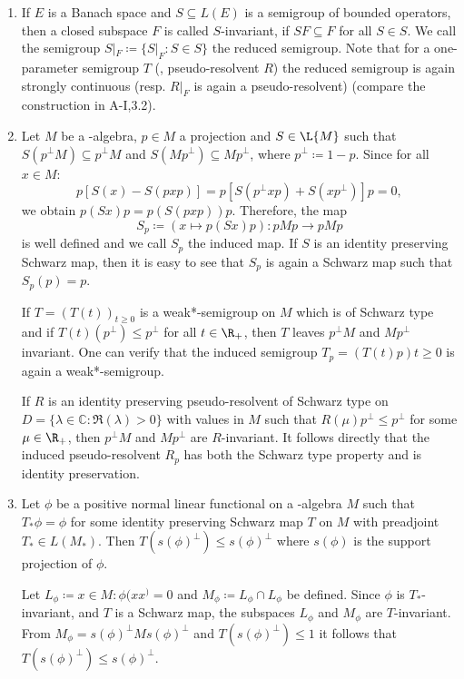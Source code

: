 \begin{enumerate}[1., wide]
\item
If $ E $ is a Banach space and $ S \subseteq L(E) $ is a semigroup of bounded operators, then a closed subspace $ F $ is called $ S $-invariant, if $ SF \subseteq F $ for all $ S \in S $.
We call the semigroup $ S|_{F} \coloneqq \{S|_{F} \colon S \in S \} $ the reduced semigroup.
Note that for a one-parameter semigroup $ T $ (\resp, pseudo-resolvent $ R $) the reduced semigroup is again strongly continuous (resp. $ R|_{F} $ is again a pseudo-resolvent) (compare the construction in A-I,3.2).

\item
Let $ M $ be a \WA-algebra, $ p \in M $ a projection and $ S \in \L{M} $ such that $ S(p^{\perp}M) \subseteq p^{\perp}M $ and $ S(Mp^{\perp}) \subseteq Mp^{\perp} $, where $ p^{\perp} \coloneqq 1-p $.
Since for all $ x \in M $:
\[
p[S(x) - S(pxp)] = p[S(p^{\perp}xp) + S(xp^{\perp})]p = 0,
\]
we obtain $ p(Sx)p = p(S(pxp))p $.
Therefore, the map
\[
S_{p} \coloneqq (x \mapsto p(Sx)p) \colon pMp \to pMp
\]
is well defined and we call $ S_{p} $ the induced map.
If $ S $ is an identity preserving Schwarz map, then it is easy to see that $ S_{p} $ is again a Schwarz map such that $ S_{p}(p) = p $.

If $ T = (T(t))_{t\geq0} $ is a weak*-semigroup on $ M $ which is of Schwarz type and if $ T(t)(p^{\perp}) \leq p^{\perp} $ for all $ t \in \R_{+} $, then $ T $ leaves $ p^{\perp}M $ and $ Mp^{\perp} $ invariant.
One can verify that the induced semigroup $T_p = (T(t)p){t\geq0}$ is again a weak*-semigroup.

If $ R $ is an identity preserving pseudo-resolvent of Schwarz type on $ D = \{\lambda \in \mathbb{C} \colon \Re(\lambda) > 0\} $ with values in $ M $ such that $ R(\mu)p^{\perp} \leq p^{\perp} $ for some $ \mu \in \R_{+} $, then $ p^{\perp}M $ and $ Mp^{\perp} $ are $ R $-invariant.
It follows directly that the induced pseudo-resolvent $R_p$ has both the Schwarz type property and is identity preservation.

\item
Let $ \phi $ be a positive normal linear functional on a \WA-algebra $ M $ such that $ T_{*}\phi = \phi $ for some identity preserving Schwarz map $ T $ on $ M $ with preadjoint $ T_{*} \in L(M_{*}) $.
Then $ T(s(\phi)^{\perp}) \leq s(\phi)^{\perp} $ where $ s(\phi) $ is the support projection of $ \phi $.

Let $L_\phi \coloneqq {x \in M: \phi(xx^) = 0}$ and $M_\phi \coloneqq L_\phi \cap L_\phi$ be defined.
Since $ \phi $ is $ T_{*} $-invariant, and $ T $ is a Schwarz map, the subspaces $ L_{\phi} $ and $ M_{\phi} $ are $ T $-invariant.
From $ M_{\phi} = s(\phi)^{\perp}Ms(\phi)^{\perp} $ and $ T(s(\phi)^{\perp}) \leq 1 $ it follows that $ T(s(\phi)^{\perp}) \leq s(\phi)^{\perp} $.

\end{enumerate}
